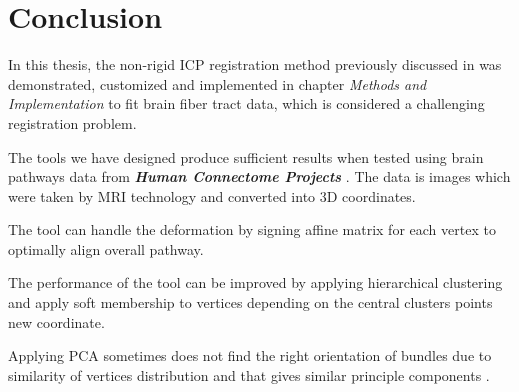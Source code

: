 \documentclass[../structure.tex]{subfiles}
\begin{document}
\chapter{Conclusion}
In this thesis, the non-rigid ICP registration method previously discussed in \cite{Amberg2007} was demonstrated, customized and implemented in chapter \textit{Methods and Implementation} to fit brain fiber tract data, which is considered a challenging registration problem.

The tools we have designed produce sufficient results when tested using brain pathways data from \textbf{\textit{Human Connectome Projects}} \cite{CCF}. The data is images which were taken by MRI technology and converted into 3D coordinates.

The tool can handle the deformation by signing affine matrix for each vertex to optimally align overall pathway.

The performance of the tool can be improved by applying hierarchical clustering and apply soft membership to vertices depending on the central clusters points new coordinate.

Applying PCA sometimes does not find the right orientation of bundles due to similarity of vertices distribution and that gives similar principle components .
\end{document}
